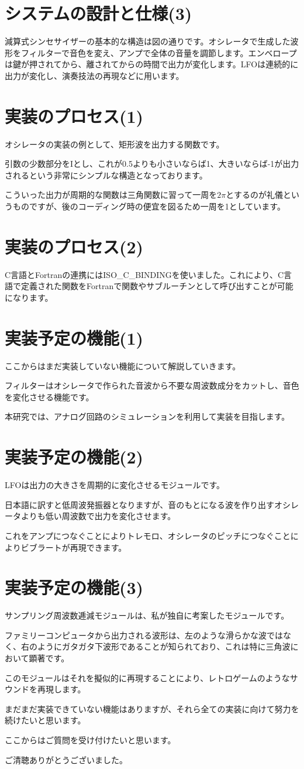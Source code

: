 \documentclass[dvipdfmx]{ujarticle}
\begin{document}
\section{システムの設計と仕様(3)}
減算式シンセサイザーの基本的な構造は図の通りです。オシレータで生成した波形をフィルターで音色を変え、アンプで全体の音量を調節します。エンベロープは鍵が押されてから、離されてからの時間で出力が変化します。LFOは連続的に出力が変化し、演奏技法の再現などに用います。\par
\section{実装のプロセス(1)}
オシレータの実装の例として、矩形波を出力する関数です。\par
引数の少数部分をIとし、これが0.5よりも小さいならば1、大きいならば-1が出力されるという非常にシンプルな構造となっております。\par
こういった出力が周期的な関数は三角関数に習って一周を$2\pi$とするのが礼儀というものですが、後のコーディング時の便宜を図るため一周を1としています。\par
\section{実装のプロセス(2)}
C言語とFortranの連携にはISO\_C\_BINDINGを使いました。これにより、C言語で定義された関数をFortranで関数やサブルーチンとして呼び出すことが可能になります。\par
\section{実装予定の機能(1)}
ここからはまだ実装していない機能について解説していきます。\par
フィルターはオシレータで作られた音波から不要な周波数成分をカットし、音色を変化させる機能です。\par
本研究では、アナログ回路のシミュレーションを利用して実装を目指します。\par
\section{実装予定の機能(2)}
LFOは出力の大きさを周期的に変化させるモジュールです。\par
日本語に訳すと低周波発振器となりますが、音のもとになる波を作り出すオシレータよりも低い周波数で出力を変化させます。\par
これをアンプにつなぐことによりトレモロ、オシレータのピッチにつなぐことによりビブラートが再現できます。\par
\section{実装予定の機能(3)}
サンプリング周波数逓減モジュールは、私が独自に考案したモジュールです。\par
ファミリーコンピュータから出力される波形は、左のような滑らかな波ではなく、右のようにガタガタ下波形であることが知られており、これは特に三角波において顕著です。\par
このモジュールはそれを擬似的に再現することにより、レトロゲームのようなサウンドを再現します。\par\par


まだまだ実装できていない機能はありますが、それら全ての実装に向けて努力を続けたいと思います。\par
ここからはご質問を受け付けたいと思います。\par\par
ご清聴ありがとうございました。
\end{document}
